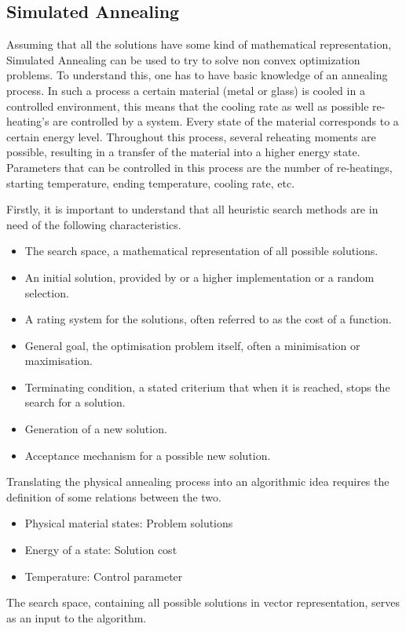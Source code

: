 \subsection{Simulated Annealing}
Assuming that all the solutions have some kind of mathematical representation, Simulated Annealing can be used to try to solve non convex optimization problems.
To understand this, one has to have basic knowledge of an annealing process.
In such a process a certain material (metal or glass) is cooled in a controlled environment, this means that the cooling rate as well as possible re-heating's are controlled by a system. 
Every state of the material corresponds to a certain energy level.
Throughout this process, several reheating moments are possible, resulting in a transfer of the material into a higher energy state.
Parameters that can be controlled in this process are the number of re-heatings, starting temperature, ending temperature, cooling rate, etc.
\par 
Firstly, it is important to understand that all heuristic search methods are in need of the following characteristics.
\begin{itemize}
	\item The search space, a mathematical representation of all possible solutions.
	\item An initial solution, provided by or a higher implementation or a random selection.
	\item A rating system for the solutions, often referred to as the cost of a function.
	\item General goal, the optimisation problem itself, often a minimisation or maximisation.
	\item Terminating condition, a stated criterium that when it is reached, stops the search for a solution.
	\item Generation of a new solution.
	\item Acceptance mechanism for a possible new solution.
\end{itemize} 
Translating the physical annealing process into an algorithmic idea requires the definition of some relations between the two.
\begin{itemize}
	\item Physical material states: Problem solutions
	\item Energy of a state: Solution cost
	\item Temperature: Control parameter
\end{itemize}
The search space, containing all possible solutions in vector representation, serves as an input to the algorithm.
